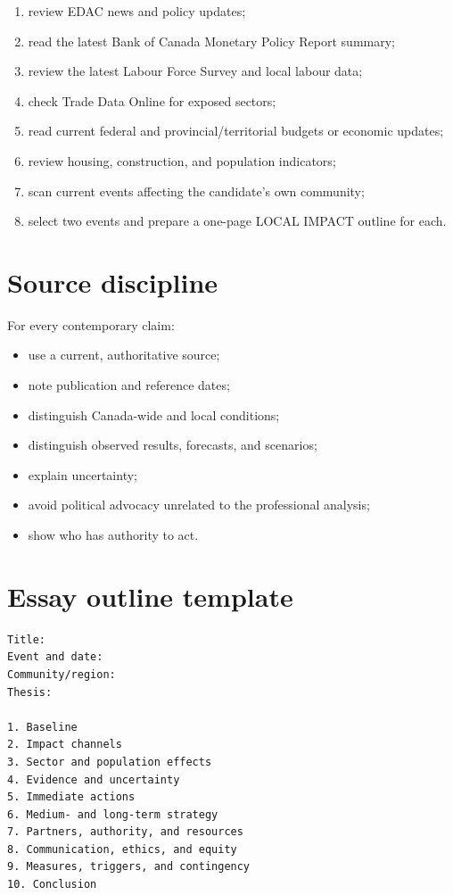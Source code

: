 \documentclass[11pt,letterpaper,oneside,openany]{book}
\begin{document}
\begin{enumerate}
\item review EDAC news and policy updates;
\item read the latest Bank of Canada Monetary Policy Report summary;
\item review the latest Labour Force Survey and local labour data;
\item check Trade Data Online for exposed sectors;
\item read current federal and provincial/territorial budgets or economic updates;
\item review housing, construction, and population indicators;
\item scan current events affecting the candidate's own community;
\item select two events and prepare a one-page LOCAL IMPACT outline for each.
\end{enumerate}


\section[Source discipline]{Source discipline}
For every contemporary claim:


\begin{itemize}
\item use a current, authoritative source;
\item note publication and reference dates;
\item distinguish Canada-wide and local conditions;
\item distinguish observed results, forecasts, and scenarios;
\item explain uncertainty;
\item avoid political advocacy unrelated to the professional analysis;
\item show who has authority to act.
\end{itemize}


\section[Essay outline template]{Essay outline template}
\begin{Verbatim}[fontsize=\small,breaklines=true,breakanywhere=true,frame=single,framesep=2mm]
Title:
Event and date:
Community/region:
Thesis:

1. Baseline
2. Impact channels
3. Sector and population effects
4. Evidence and uncertainty
5. Immediate actions
6. Medium- and long-term strategy
7. Partners, authority, and resources
8. Communication, ethics, and equity
9. Measures, triggers, and contingency
10. Conclusion
\end{Verbatim}
\end{document}
